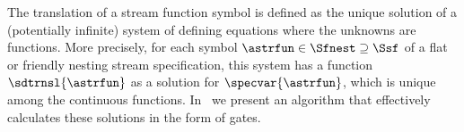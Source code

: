 %
%
The translation of a stream function symbol
is defined as the unique solution of a (potentially infinite) 
system of defining equations where the unknowns are functions.
More precisely, for each symbol $\astrfun \in \Sfnest \supseteq \Ssf$ of a flat
or friendly nesting stream specification, 
this system has a \pein{} function 
$\sdtrnsl{\astrfun}$ %
as a solution for $\specvar{\astrfun}$, 
which is unique among the continuous functions.
In~\cite{endr:grab:hend:2008} we present an algorithm that effectively calculates 
these solutions in the form of gates. %
%
